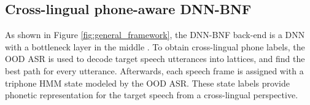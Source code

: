 \documentclass[a4paper]{article}
\begin{document}
\subsection{Cross-lingual phone-aware DNN-BNF}
As shown in Figure \ref{fig:general_framework}, the DNN-BNF back-end
is a DNN with a bottleneck   layer in the middle \cite{grezl2009investigation}. 
To obtain cross-lingual phone labels, the OOD ASR is used to decode  target speech utterances into  lattices,  and find the best path for every utterance. Afterwards, each speech frame is assigned with a triphone HMM state modeled by the OOD ASR. These   state labels provide phonetic representation for the target speech from a cross-lingual perspective. %

\end{document}

